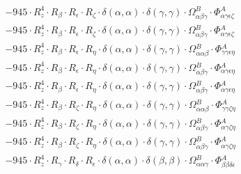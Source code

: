 \documentclass{article}
\begin{document}
\begin{subequations}
\begin{gather}
\begin{array}{c}
 \\[0.2em] 		 - 945 \cdot R_{z}^{4} \cdot R_{\beta{}} \cdot R_{\epsilon{}} \cdot R_{\zeta{}} \cdot \delta{}\left(\alpha{}, \alpha{}\right) \cdot \delta{}\left(\gamma{}, \gamma{}\right) \cdot \Omega{}^{B}_{\alpha{}\beta{}\gamma{}} \cdot \Phi{}^{A}_{\alpha{}\gamma{}\epsilon{}\zeta{}} 
 \\[0.2em] 		 - 945 \cdot R_{z}^{4} \cdot R_{\beta{}} \cdot R_{\epsilon{}} \cdot R_{\zeta{}} \cdot \delta{}\left(\alpha{}, \alpha{}\right) \cdot \delta{}\left(\gamma{}, \gamma{}\right) \cdot \Omega{}^{B}_{\alpha{}\beta{}\gamma{}} \cdot \Phi{}^{A}_{\alpha{}\gamma{}\epsilon{}\zeta{}} 
 \\[0.2em] 		 - 945 \cdot R_{z}^{4} \cdot R_{\beta{}} \cdot R_{\epsilon{}} \cdot R_{\eta{}} \cdot \delta{}\left(\alpha{}, \alpha{}\right) \cdot \delta{}\left(\gamma{}, \gamma{}\right) \cdot \Omega{}^{B}_{\alpha{}\alpha{}\beta{}} \cdot \Phi{}^{A}_{\gamma{}\gamma{}\epsilon{}\eta{}} 
 \\[0.2em] 		 - 945 \cdot R_{z}^{4} \cdot R_{\beta{}} \cdot R_{\epsilon{}} \cdot R_{\eta{}} \cdot \delta{}\left(\alpha{}, \alpha{}\right) \cdot \delta{}\left(\gamma{}, \gamma{}\right) \cdot \Omega{}^{B}_{\alpha{}\beta{}\gamma{}} \cdot \Phi{}^{A}_{\alpha{}\gamma{}\epsilon{}\eta{}} 
 \\[0.2em] 		 - 945 \cdot R_{z}^{4} \cdot R_{\beta{}} \cdot R_{\epsilon{}} \cdot R_{\eta{}} \cdot \delta{}\left(\alpha{}, \alpha{}\right) \cdot \delta{}\left(\gamma{}, \gamma{}\right) \cdot \Omega{}^{B}_{\alpha{}\beta{}\gamma{}} \cdot \Phi{}^{A}_{\alpha{}\gamma{}\epsilon{}\eta{}} 
 \\[0.2em] 		 - 945 \cdot R_{z}^{4} \cdot R_{\beta{}} \cdot R_{\zeta{}} \cdot R_{\eta{}} \cdot \delta{}\left(\alpha{}, \alpha{}\right) \cdot \delta{}\left(\gamma{}, \gamma{}\right) \cdot \Omega{}^{B}_{\alpha{}\alpha{}\beta{}} \cdot \Phi{}^{A}_{\gamma{}\gamma{}\zeta{}\eta{}} 
 \\[0.2em] 		 - 945 \cdot R_{z}^{4} \cdot R_{\beta{}} \cdot R_{\zeta{}} \cdot R_{\eta{}} \cdot \delta{}\left(\alpha{}, \alpha{}\right) \cdot \delta{}\left(\gamma{}, \gamma{}\right) \cdot \Omega{}^{B}_{\alpha{}\beta{}\gamma{}} \cdot \Phi{}^{A}_{\alpha{}\gamma{}\zeta{}\eta{}} 
 \\[0.2em] 		 - 945 \cdot R_{z}^{4} \cdot R_{\beta{}} \cdot R_{\zeta{}} \cdot R_{\eta{}} \cdot \delta{}\left(\alpha{}, \alpha{}\right) \cdot \delta{}\left(\gamma{}, \gamma{}\right) \cdot \Omega{}^{B}_{\alpha{}\beta{}\gamma{}} \cdot \Phi{}^{A}_{\alpha{}\gamma{}\zeta{}\eta{}} 
 \\[0.2em] 		 - 945 \cdot R_{z}^{4} \cdot R_{\gamma{}} \cdot R_{\delta{}} \cdot R_{\epsilon{}} \cdot \delta{}\left(\alpha{}, \alpha{}\right) \cdot \delta{}\left(\beta{}, \beta{}\right) \cdot \Omega{}^{B}_{\alpha{}\alpha{}\gamma{}} \cdot \Phi{}^{A}_{\beta{}\beta{}\delta{}\epsilon{}} 

\end{array}
\end{gather}
\end{subequations}
\end{document}
